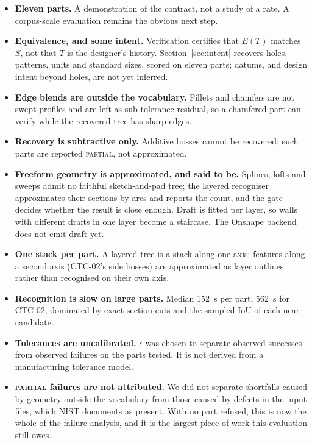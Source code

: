 \documentclass[11pt]{article}
\newcommand{\PARTIAL}{\textsc{partial}}
\begin{document}
\begin{itemize}
\item \textbf{Eleven parts.} A demonstration of the contract, not a study of a
  rate. A corpus-scale evaluation remains the obvious next step.
\item \textbf{Equivalence, and some intent.} Verification certifies that $E(T)$
  matches $S$, not that $T$ is the designer's history. Section~\ref{sec:intent}
  recovers holes, patterns, units and standard sizes, scored on eleven parts;
  datums, and design intent beyond holes, are not yet inferred.
\item \textbf{Edge blends are outside the vocabulary.} Fillets and chamfers are
  not swept profiles and are left as sub-tolerance residual, so a chamfered part
  can verify while the recovered tree has sharp edges.
\item \textbf{Recovery is subtractive only.} Additive bosses cannot be
  recovered; such parts are reported \PARTIAL{}, not approximated.
\item \textbf{Freeform geometry is approximated, and said to be.} Splines,
  lofts and sweeps admit no faithful sketch-and-pad tree; the layered recogniser
  approximates their sections by arcs and reports the count, and the gate
  decides whether the result is close enough. Draft is fitted per layer, so walls
  with different drafts in one layer become a staircase. The Onshape backend
  does not emit draft yet.
\item \textbf{One stack per part.} A layered tree is a stack along one axis;
  features along a second axis (CTC-02's side bosses) are approximated as layer
  outlines rather than recognised on their own axis.
\item \textbf{Recognition is slow on large parts.} Median \SI{152}{\second} per
  part, \SI{562}{\second} for CTC-02, dominated by exact section cuts and the
  sampled IoU of each near candidate.
\item \textbf{Tolerances are uncalibrated.} $\epsilon$ was chosen to separate
  observed successes from observed failures on the parts tested. It is not
  derived from a manufacturing tolerance model.
\item \textbf{\PARTIAL{} failures are not attributed.} We did not separate
  shortfalls caused by geometry outside the vocabulary from those caused by
  defects in the input files, which NIST documents as present. With no part
  refused, this is now the whole of the failure analysis, and it is the largest
  piece of work this evaluation still owes.
\end{itemize}
\end{document}
